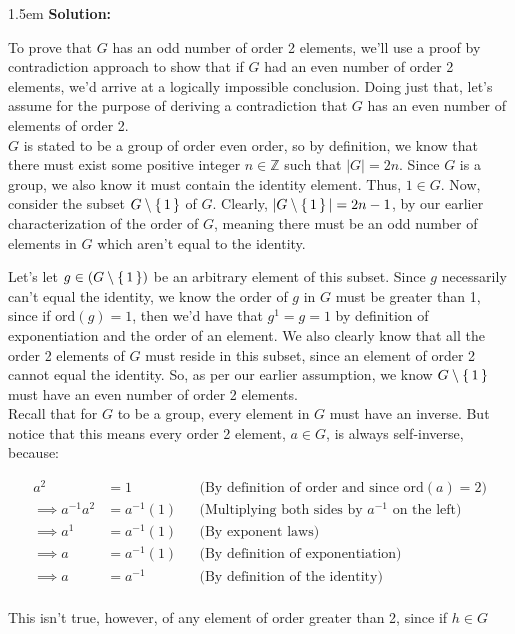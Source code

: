 \documentclass{article}
\newenvironment{solution}{
	\vspace{.5em}
	\par
	\begin{adjustwidth}{1.5em}{}
	\textbf{{Solution:}}
	\par
	\vspace{.5em}
}{
	\vspace{1em}
	\end{adjustwidth}
	\setcounter{step}{0}
	\newpage
}
\newcounter{step}
\newcommand{\ord}[1]{\text{ord}({#1})}
\begin{document}
\begin{solution}
	To prove that $G$ has an odd number of order 2 elements, we'll use a proof by contradiction approach to show that if $G$ had an even number of order 2 elements, we'd arrive at a logically impossible conclusion. Doing just that, let's assume for the purpose of deriving a contradiction that $G$ has an even number of elements of order 2. \\

	$G$ is stated to be a group of order even order, so by definition, we know that there must exist some positive integer $n \in \mathbb{Z}$ such that $|G| = 2n$. Since $G$ is a group, we also know it must contain the identity element. Thus, $1 \in G$. Now, consider the subset $G \setminus \set{1}$ of $G$. Clearly, $|G \setminus \set{1}| = 2n - 1$, by our earlier characterization of the order of $G$, meaning there must be an odd number of elements in $G$ which aren't equal to the identity.

	Let's let $g \in (G \setminus \set{1})$ be an arbitrary element of this subset. Since $g$ necessarily can't equal the identity, we know the order of $g$ in $G$ must be greater than 1, since if $\ord{g} = 1$, then we'd have that $g^{1} = g = 1$ by definition of exponentiation and the order of an element. We also clearly know that all the order 2 elements of $G$ must reside in this subset, since an element of order 2 cannot equal the identity. So, as per our earlier assumption, we know $G \setminus \set{1}$ must have an even number of order 2 elements. \\

	Recall that for $G$ to be a group, every element in $G$ must have an inverse. But notice that this means every order 2 element, $a \in G$, is always self-inverse, because:

	\begin{align*}
		a^{2} &= 1 &&\text{(By definition of order and since $\ord{a} = 2$)} \\
		\implies a^{-1}a^{2} &= a^{-1}(1) &&\text{(Multiplying both sides by $a^{-1}$ on the left)} \\
		\implies a^{1} &= a^{-1}(1) &&\text{(By exponent laws)} \\
		\implies a &= a^{-1}(1) &&\text{(By definition of exponentiation)} \\
		\implies a &= a^{-1} &&\text{(By definition of the identity)} \\
	\end{align*}

	This isn't true, however, of any element of order greater than 2, since if $h \in G$ 
\end{solution}
\end{document}
